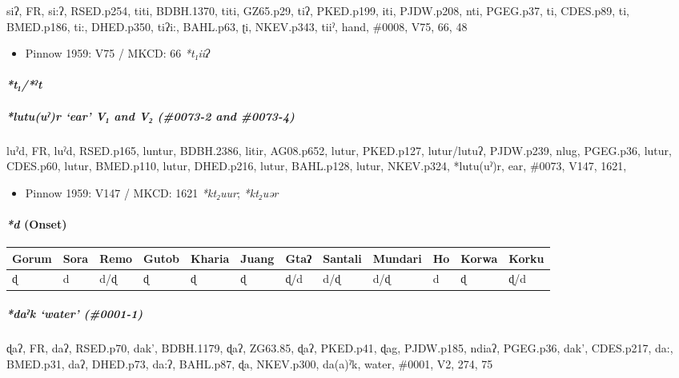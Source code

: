 \documentclass[a4paper,]{article}
\providecommand{\tightlist}{%
  \setlength{\itemsep}{0pt}\setlength{\parskip}{0pt}}
\let\oldparagraph\paragraph
\renewcommand{\paragraph}[1]{\oldparagraph{#1}\mbox{}}
\let\oldsubparagraph\subparagraph
\renewcommand{\subparagraph}[1]{\oldsubparagraph{#1}\mbox{}}
\begin{document}
siʔ, FR, si:ʔ, RSED.p254, titi, BDBH.1370, titi, GZ65.p29, tiʔ,
PKED.p199, iti, PJDW.p208, nti, PGEG.p37, ti, CDES.p89, ti, BMED.p186,
ti:, DHED.p350, tiʔi:, BAHL.p63, ʈi, NKEV.p343, tiiˀ, hand, \#0008, V75,
66, 48

\begin{itemize}
\tightlist
\item
  Pinnow 1959: V75 / MKCD: 66 \emph{*t₁iiʔ}
\end{itemize}

\paragraph{\texorpdfstring{\emph{*t₁/*ˀt}}{*t₁/*ˀt}}\label{tux2c0t}

\subparagraph{\texorpdfstring{\emph{*lutu(uˀ)r} `ear' V₁ and V₂
(\#0073-2 and
\#0073-4)}{*lutu(uˀ)r ear V₁ and V₂ (\#0073-2 and \#0073-4)}}\label{lutuuux2c0r-ear-v-and-v-0073-2-and-0073-4-1}

luˀd, FR, luˀd, RSED.p165, luntur, BDBH.2386, litir, AG08.p652, lutur,
PKED.p127, lutur/lutuʔ, PJDW.p239, nlug, PGEG.p36, lutur, CDES.p60,
lutur, BMED.p110, lutur, DHED.p216, lutur, BAHL.p128, lutur, NKEV.p324,
*lutu(uˀ)r, ear, \#0073, V147, 1621,

\begin{itemize}
\tightlist
\item
  Pinnow 1959: V147 / MKCD: 1621 \emph{*kt₂uur}; \emph{*kt₂uər}
\end{itemize}

\paragraph{\texorpdfstring{\emph{*d}
(Onset)}{*d (Onset)}}\label{d-onset}

\begin{longtable}[]{@{}llllllllllll@{}}
\toprule
Gorum & Sora & Remo & Gutob & Kharia & Juang & Gtaʔ & Santali & Mundari
& Ho & Korwa & Korku\tabularnewline
\midrule
\endhead
ɖ & d & d/ɖ & ɖ & ɖ & ɖ & ɖ/d & d/ɖ & d/ɖ & d & ɖ & ɖ/d\tabularnewline
\bottomrule
\end{longtable}

\subparagraph{\texorpdfstring{\emph{*daˀk} `water'
(\#0001-1)}{*daˀk water (\#0001-1)}}\label{daux2c0k-water-0001-1}

ɖaʔ, FR, daʔ, RSED.p70, dak', BDBH.1179, ɖaʔ, ZG63.85, ɖaʔ, PKED.p41,
ɖag, PJDW.p185, ndiaʔ, PGEG.p36, dak', CDES.p217, da:, BMED.p31, daʔ,
DHED.p73, da:ʔ, BAHL.p87, ɖa, NKEV.p300, da(a)ˀk, water, \#0001, V2,
274, 75
\end{document}
